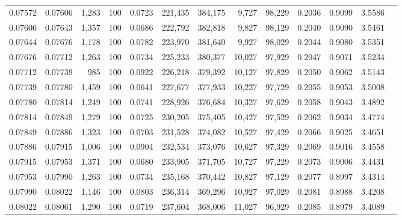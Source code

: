 \begin{tabular}{rrrrrrrrrrrrr}
0.07572 & 0.07606 & 1,283 & 100 &                                     0.0723 & 221,435 & 384,175 &   9,727 &  98,229 & 0.2036 & 0.9099 & 3.5586 \\
0.07606 & 0.07643 & 1,357 & 100 &                                     0.0686 & 222,792 & 382,818 &   9,827 &  98,129 & 0.2040 & 0.9090 & 3.5461 \\
0.07644 & 0.07676 & 1,178 & 100 &                                     0.0782 & 223,970 & 381,640 &   9,927 &  98,029 & 0.2044 & 0.9080 & 3.5351 \\
0.07676 & 0.07712 & 1,263 & 100 &                                     0.0734 & 225,233 & 380,377 &  10,027 &  97,929 & 0.2047 & 0.9071 & 3.5234 \\
0.07712 & 0.07739 &   985 & 100 &                                     0.0922 & 226,218 & 379,392 &  10,127 &  97,829 & 0.2050 & 0.9062 & 3.5143 \\
0.07739 & 0.07780 & 1,459 & 100 &                                     0.0641 & 227,677 & 377,933 &  10,227 &  97,729 & 0.2055 & 0.9053 & 3.5008 \\
0.07780 & 0.07814 & 1,249 & 100 &                                     0.0741 & 228,926 & 376,684 &  10,327 &  97,629 & 0.2058 & 0.9043 & 3.4892 \\
0.07814 & 0.07849 & 1,279 & 100 &                                     0.0725 & 230,205 & 375,405 &  10,427 &  97,529 & 0.2062 & 0.9034 & 3.4774 \\
0.07849 & 0.07886 & 1,323 & 100 &                                     0.0703 & 231,528 & 374,082 &  10,527 &  97,429 & 0.2066 & 0.9025 & 3.4651 \\
0.07886 & 0.07915 & 1,006 & 100 &                                     0.0904 & 232,534 & 373,076 &  10,627 &  97,329 & 0.2069 & 0.9016 & 3.4558 \\
0.07915 & 0.07953 & 1,371 & 100 &                                     0.0680 & 233,905 & 371,705 &  10,727 &  97,229 & 0.2073 & 0.9006 & 3.4431 \\
0.07953 & 0.07990 & 1,263 & 100 &                                     0.0734 & 235,168 & 370,442 &  10,827 &  97,129 & 0.2077 & 0.8997 & 3.4314 \\
0.07990 & 0.08022 & 1,146 & 100 &                                     0.0803 & 236,314 & 369,296 &  10,927 &  97,029 & 0.2081 & 0.8988 & 3.4208 \\
0.08022 & 0.08061 & 1,290 & 100 &                                     0.0719 & 237,604 & 368,006 &  11,027 &  96,929 & 0.2085 & 0.8979 & 3.4089 \\

\end{tabular}
